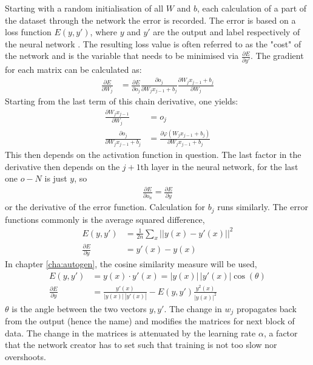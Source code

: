\documentclass[10pt, a4paper]{UUThesisTemplate}
\begin{document}
Starting with a random initialisation of all $W$ and $b$, each calculation of a part of the dataset through the network the error is recorded. The error is based on a loss function $E(y, y')$, where $y$ and $y'$ are the output and label respectively of the neural network \cite{backpropagation}. The resulting loss value is often referred to as the "cost" of the network and is the variable that needs to be minimised via $\frac{\partial E}{\partial y'}$. The gradient for each matrix can be calculated as:
\begin{align}
\frac{\partial E}{\partial W_j} &= \frac{\partial E}{\partial o_j}\frac{\partial o_j}{\partial W_j x_{j-1} + b_j}\frac{\partial W_j x_{j-1} + b_j}{\partial W_j}
\end{align}
Starting from the  last term of this chain derivative, one yields:
\begin{align}
\frac{\partial W_j x_{j-1}}{\partial W_j} &= o_j\\
\frac{\partial o_j}{\partial W_j x_{j-1} + b_j} &= \frac{\partial \varphi(W_j x_{j-1} + b_j)}{\partial W_j x_{j-1} + b_j}
\end{align}
This then depends on the activation function in question. The last factor in the derivative then depends on the $j+1$th layer in the neural network, for the last one $o-N$ is just $y$, so
\begin{align}
\frac{\partial E}{\partial o_n} = \frac{\partial E}{\partial y}
\end{align}
or the derivative of the error function. Calculation for $b_j$ runs similarly. The error functions commonly is the average squared difference, 
\begin{align}
E(y,y') &= \frac 1{2n} \sum_x ||y(x) - y'(x)||^2\label{eq:avgdiff}\\
\frac{\partial E}{\partial y} &= y'(x) - y(x)
\end{align}
In chapter \ref{cha:autogen}, the cosine similarity measure will be used, \cite{cossim}
\begin{align}
E(y,y') &= y(x) \cdot y'(x) = |y(x)|\,|y'(x)| \cos(\theta)\label{eq:cossim}\\
\frac{\partial E}{\partial y} &= \frac{y'(x)}{|y(x)|\,|y'(x)|} - E(y,y') \frac{y^2(x)}{|y(x)|^2}
\end{align}
$\theta$ is the angle between the two vectors $y, y'$. The change in $w_j$ propagates back from the output (hence the name) and modifies the matrices for next block of data. The change in the matrices is attenuated by the learning rate $\alpha$, a factor that the network creator has to set such that training is not too slow nor overshoots. 
\end{document}

